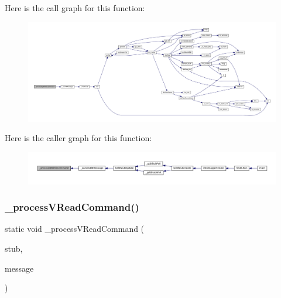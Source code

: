 Here is the call graph for this function\+:
\nopagebreak
\begin{figure}[H]
\begin{center}
\leavevmode
\includegraphics[width=350pt]{gdb-stub_8c_a34a7a41e3881752f1882a6edccd6edce_cgraph}
\end{center}
\end{figure}
Here is the caller graph for this function\+:
\nopagebreak
\begin{figure}[H]
\begin{center}
\leavevmode
\includegraphics[width=350pt]{gdb-stub_8c_a34a7a41e3881752f1882a6edccd6edce_icgraph}
\end{center}
\end{figure}
\mbox{\label{gdb-stub_8c_a28273f2230ac620b2972bd50b2e6e6a9}} 
\subsubsection{\texorpdfstring{\+\_\+process\+V\+Read\+Command()}{\_processVReadCommand()}}
{\footnotesize\ttfamily static void \+\_\+process\+V\+Read\+Command (\begin{DoxyParamCaption}\item[{struct G\+D\+B\+Stub $\ast$}]{stub,  }\item[{const char $\ast$}]{message }\end{DoxyParamCaption})\hspace{0.3cm}{\ttfamily [static]}}

